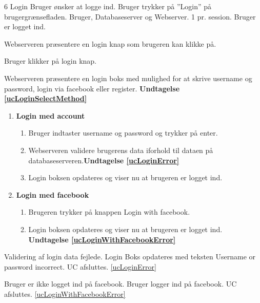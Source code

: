 
\uchead
	{6}
	{Login}
	{Bruger ønsker at logge ind.}
	{Bruger trykker på ''Login'' på brugergrænsefladen.}
	{Bruger, Databaseserver og Webserver.}
	{}
	{1 pr. session.}
	{Bruger er logget ind.}	
  
		
\item\label{ucLoginPresentBox} Webserveren præsentere en login knap som brugeren kan klikke på.

\item Bruger klikker på login knap.

\item\label{ucLoginSelectMethod} Webserveren præsentere en login boks med mulighed for at skrive username og password, login via facebook eller register. \textbf{Undtagelse \ref{ucLoginSelectMethod}}

\begin{enumerate}

\item \textbf{Login med account}

	\begin{enumerate}
	
		\item Bruger indtaster username og password og trykker på enter.
		\item \label{ucLoginError}Webserveren validere brugerens data iforhold til dataen på databaseserveren.\textbf{Undtagelse \ref{ucLoginError}}
		
		\item Login boksen opdateres og viser nu at brugeren er logget ind.
	
		
	\end{enumerate}


\item \textbf{Login med facebook}
	
	\begin{enumerate}
		\item Brugeren trykker på knappen Login with facebook.
		
		\item\label{ucLoginWithFacebookError} Login boksen opdateres og viser nu at brugeren er logget ind. \textbf{Undtagelse \ref{ucLoginWithFacebookError}}
				
	\end{enumerate}
\end{enumerate}
\ucdescriptionend %
	\ucextension
	{Validering af login data fejlede. Login Boks opdateres med teksten Username or password incorrect.}
	{UC afsluttes.}
	{\ref{ucLoginError}}

\ucextension
	{Bruger er ikke logget ind på facebook. Bruger logger ind på facebook.}
	{UC afsluttes.}
	{\ref{ucLoginWithFacebookError}}


